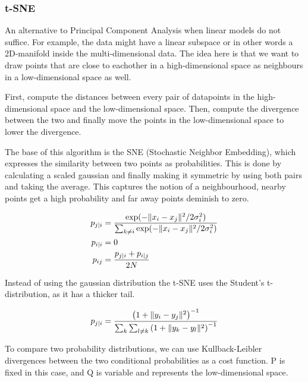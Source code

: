 \subsubsection{t-SNE}

An alternative to Principal Component Analysis when linear models
do not suffice. For example, the data might have a linear subspace
or in other words a 2D-manifold inside the multi-dimensional data.
The idea here is that we want to draw points that are close to
eachother in a high-dimensional space as neighbours in a low-dimensional
space as well.

First, compute the distances between every pair of datapoints in the
high-dimensional space and the low-dimensional space. Then, compute the
divergence between the two and finally move the points in the low-dimensional
space to lower the divergence.

The base of this algorithm is the SNE (Stochastic Neighbor Embedding), which
expresses the similarity between two points as probabilities. This is done by
calculating a scaled gaussian and finally making it symmetric by using both
pairs and taking the average. This captures the notion of a
neighbourhood, nearby points get
a high probability and far away points deminish to zero.

\begin{definition}
  \begin{align*}
    p_{j|i} &= \frac{
      \exp(
        -\lVert x_i - x_j\rVert^2 / 2\sigma_i^2
      )
    }{
      \sum_{k \neq i} \exp(
        -\lVert x_i - x_j\rVert^2 / 2\sigma_i^2
      )
    } \\
    p_{i|i} &= 0 \\
    p_{ij} &= \frac{p_{j|i} + p_{i|j}}{2N}
  \end{align*}
\end{definition}

Instead of using the gaussian distribution the t-SNE uses the Student's
t-distribution, as it has a thicker tail.

\begin{definition}
  \begin{align*}
    p_{j|i} = \frac{
      \left(1 + \lVert y_i - y_j\rVert^2\right)^{-1}
    }{
      \sum_{k} \sum_{l \neq k}
      \left(1 + \lVert y_k - y_l\rVert^2\right)^{-1}
    }
  \end{align*}
\end{definition}

To compare two probability distributions, we can use
Kullback-Leibler divergences between the two conditional
probabilities as a cost function. P is fixed in this case,
and Q is variable and represents the low-dimensional space.

